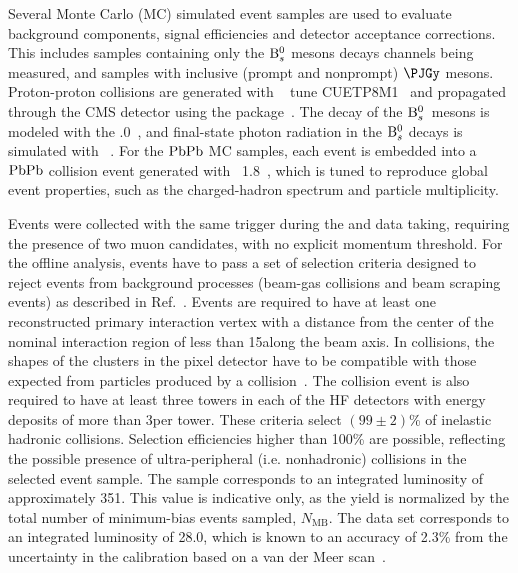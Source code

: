 Several Monte Carlo (MC) simulated event samples are used to evaluate background components, signal efficiencies and detector acceptance corrections. This includes samples containing only the ${\mathrm{B}_{s}^{0}}$ mesons decays channels being measured, and samples with inclusive (prompt and nonprompt) $\PJGy$ mesons.
Proton-proton collisions are generated with ~\cite{Sjostrand:2014zea} tune CUETP8M1~\cite{Khachatryan:2015pea} and propagated through the CMS detector using the \GEANTfour package~\cite{geant4}.
The decay of the ${\mathrm{B}_{s}^{0}}$~mesons is modeled with the .0~\cite{evtgen}, and final-state photon radiation in the ${\mathrm{B}_{s}^{0}}$ decays is simulated with ~\cite{Barberio:1990ms}. For the $\mathrm{PbPb}$ MC samples, each  event is embedded into a $\mathrm{PbPb}$ collision event generated with {\HYDJET}~1.8~\cite{Lokhtin:2005px}, which is tuned to reproduce global event properties, such as the charged-hadron \pt spectrum and particle multiplicity.

Events were collected with the same trigger during the \pp and \PbPb data taking, requiring the presence of two muon candidates, with no explicit momentum threshold. For the offline analysis, events have to pass a set of selection criteria designed to reject events from background processes
(beam-gas collisions and beam scraping events) as described in Ref.~\cite{Khachatryan:2016odn}. Events are required to have
at least one reconstructed primary interaction vertex with a distance from the center of the nominal interaction region of less than 15\cm along the beam axis. In \PbPb collisions, the
shapes of the clusters in the pixel detector have to be compatible with those expected from particles produced by a \PbPb collision~\cite{Khachatryan:2010xs}. The \PbPb collision event is also required to have at least
three towers in each of the HF detectors with energy deposits of more than 3\GeV per tower. These criteria select $(99\pm2)$\% of inelastic hadronic \PbPb collisions. Selection efficiencies higher
than 100\% are possible, reflecting the possible presence of ultra-peripheral (i.e. nonhadronic) collisions in the selected event sample. The \PbPb sample corresponds to an integrated luminosity of approximately 351\mubinv. 
This value is indicative only, as the \PbPb yield is normalized by the total number of minimum-bias events sampled, $N_{\text{MB}}$. The \pp data set corresponds to an integrated luminosity of 28.0\pbinv, which is known to an accuracy of 2.3\% from the uncertainty in the calibration based on a van der Meer scan~\cite{CMS-PAS-LUM-16-001}.

